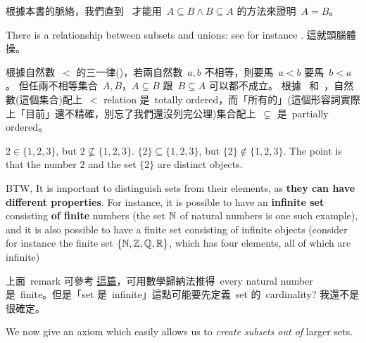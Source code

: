 \begin{note}
根據本書的脈絡，我們直到\  才能用\ \(A \subseteq B \land B \subseteq A\) 的方法來證明\ \(A = B\)。
\end{note}

\begin{remark} \label{remark 3.1.19}
There is a relationship between subsets and unions: see for instance . 這就頭腦體操。
\end{remark}

\begin{remark}  \label{remark 3.1.20}
根據自然數\ \(<\) 的三一律()，若兩自然數\ \(a, b\) 不相等，則要馬\ \(a < b\) 要馬\ \(b < a\)。
但任兩不相等集合\ \(A, B\)，\(A \subsetneq B\) 跟\ \(B \subsetneq A\) 可以都不成立。
根據\  和\ ，自然數(這個集合)配上\ \(<\) relation 是\ totally ordered，而「所有的」(這個形容詞實際上「目前」還不精確，別忘了我們還沒列完公理)集合配上\ \(\subsetneq\) 是\ partially ordered。
\end{remark}

\begin{remark}  \label{remark 3.1.21}
\(2 \in \{1, 2, 3\}\), but \(2 \not \subseteq \{1, 2, 3\}\). \(\{2\} \subseteq \{1, 2, 3\}\), but \(\{2\} \notin \{1, 2, 3\}\). The point is that the number \(2\) and the set \(\{2\}\) are distinct objects.

BTW, It is important to distinguish sets from their elements, as \textbf{they can have different properties}. For instance, it is possible to have an \textbf{infinite set} consisting \textbf{of finite} numbers (the set \(\mathbb{N}\) of natural numbers is one such example), and it is also possible to have a finite set consisting of infinite objects (consider for instance the finite set \(\{ \mathbb{N}, \mathbb{Z} , \mathbb{Q} , \mathbb{R} \} \), which has four elements, all of which are infinite)
\end{remark}

\begin{note}
上面\ remark 可參考 \href{https://math.stackexchange.com/questions/851599/why-set-of-natural-numbers-is-infinite-while-each-natural-number-is-finite}{這篇}，可用數學歸納法推得\ every natural number 是\ finite。但是「set 是\ infinite」這點可能要先定義\ set 的\ cardinality? 我還不是很確定。
\end{note}

We now give an axiom which easily allows us to \emph{create subsets out of} larger sets.

